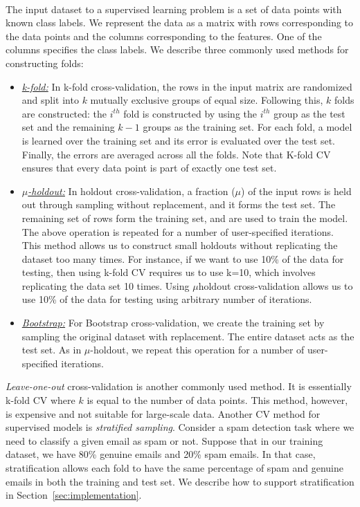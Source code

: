 \documentclass{vldb}
\newcommand{\topic}[1]{\par \smallskip \smallskip \noindent{\bf \uline{#1}}}
\begin{document}
\topic{Supervised learning:}\\ The input dataset to a supervised learning problem is a set of data
points with known class labels. We represent the data as a matrix with rows corresponding to the
data points and the columns corresponding to the features. One of the columns specifies the class
labels. We describe three commonly used methods for constructing folds:

\begin{itemize}
\item \underline{\em k-fold:} In k-fold cross-validation, the rows in the input matrix are
  randomized and split into $k$ mutually exclusive groups of equal size. Following this, $k$ folds
  are constructed: the $i^{th}$ fold is constructed by using the $i^{th}$ group as the test set and
  the remaining $k-1$ groups as the training set. For each fold, a model is learned over the training
  set and its error is evaluated over the test set. Finally, the errors are averaged across all the
  folds. Note that K-fold CV ensures that every data point is part of exactly one test set.

\item \underline{\em $\mu$-holdout:} In holdout cross-validation, a fraction ($\mu$) of the input
  rows is held out through sampling without replacement, and it forms the test set. The remaining
  set of rows form the training set, and are used to train the model. The above operation is
  repeated for a number of user-specified iterations. This method allows us to construct small
  holdouts without replicating the dataset too many times. For instance, if we want to use 10\% of
  the data for testing, then using k-fold CV requires us to use k=10, which involves replicating the
  data set 10 times. Using $\mu$\-holdout cross-validation allows us to use 10\% of the data for
  testing using arbitrary number of iterations.

\item \underline{\em Bootstrap:} For Bootstrap cross-validation, we create the training set by
  sampling the original dataset with replacement. The entire dataset acts as the test set. As in
  $\mu$-holdout, we repeat this operation for a number of user-specified iterations.
\end{itemize}

{\em Leave-one-out} cross-validation is another commonly used method. It is essentially k-fold CV
where $k$ is equal to the number of data points. This method, however, is expensive and not suitable
for large-scale data.  Another CV method for supervised models is {\em stratified
  sampling}. Consider a spam detection task where we need to classify a given email as spam or
not. Suppose that in our training dataset, we have 80\% genuine emails and 20\% spam emails. In that
case, stratification allows each fold to have the same percentage of spam and genuine emails in both
the training and test set. We describe how to support stratification in
Section~\ref{sec:implementation}.
\end{document}
